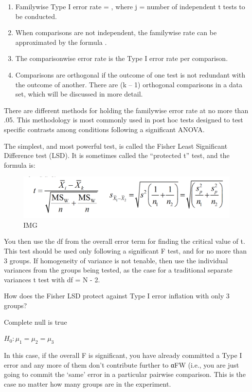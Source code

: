 \documentclass[]{book}
\providecommand{\tightlist}{%
  \setlength{\itemsep}{0pt}\setlength{\parskip}{0pt}}
\theoremstyle{definition}
\theoremstyle{definition}
\theoremstyle{definition}
\theoremstyle{remark}
\begin{document}
\begin{enumerate}
\def\labelenumi{\alph{enumi}.}
\tightlist
\item
  Familywise Type I error rate = , where j = number of independent t
  tests to be conducted.
\item
  When comparisons are not independent, the familywise rate can be
  approximated by the formula .
\item
  The comparisonwise error rate is the Type I error rate per comparison.
\item
  Comparisons are orthogonal if the outcome of one test is not redundant
  with the outcome of another. There are (k -- 1) orthogonal comparisons
  in a data set, which will be discussed in more detail.
\end{enumerate}

There are different methods for holding the familywise error rate at no
more than .05. This methodology is most commonly used in post hoc tests
designed to test specific contrasts among conditions following a
significant ANOVA.

The simplest, and most powerful test, is called the Fisher Least
Significant Difference test (LSD). It is sometimes called the
``protected t'' test, and the formula is:

\begin{figure}
\centering
\includegraphics{img/hicksphc1.png}
\caption{IMG}
\end{figure}

You then use the df from the overall error term for finding the critical
value of t. This test should be used only following a significant F
test, and for no more than 3 groups. If homogeneity of variance is not
tenable, then use the individual variances from the groups being tested,
as the case for a traditional separate variances t test with df = N - 2.

How does the Fisher LSD protect against Type I error inflation with only
3 groups?

Complete null is true

\(H_0 : \mu_1 = \mu_2 = \mu_3\)

In this case, if the overall F is significant, you have already
committed a Type I error and any more of them don't contribute further
to αFW (i.e., you are just going to commit the `same' error in a
particular pairwise comparison. This is the case no matter how many
groups are in the experiment.
\end{document}
